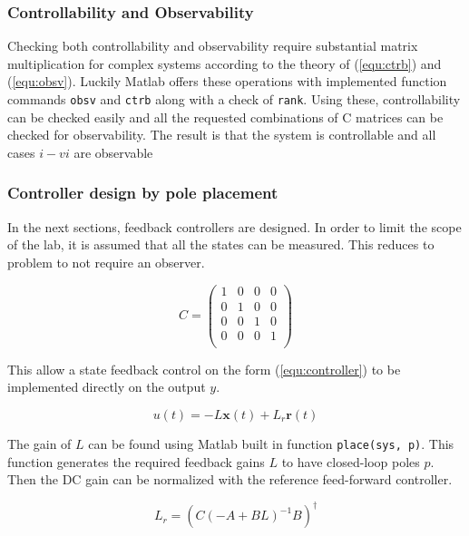 \documentclass[a4paper, titlepage]{article}
\begin{document}
\subsubsection{Controllability and Observability}
Checking both controllability and observability require substantial matrix multiplication for complex systems according to the theory of (\ref{equ:ctrb}) and (\ref{equ:obsv}).
Luckily Matlab offers these operations with implemented function commands \verb|obsv| and \verb|ctrb| along with a check of \verb|rank|.
Using these, controllability can be checked easily and all the requested combinations of C matrices can be checked for observability.
The result is that the system is controllable and all cases $i - vi$ are observable

\subsubsection{Controller design by pole placement}
In the next sections, feedback controllers are designed.
In order to limit the scope of the lab, it is assumed that all the states can be measured.
This reduces to problem to not require an observer.

\begin{equation}
C = \begin{pmatrix}
1 & 0 & 0 & 0 \\
0 & 1 & 0 & 0 \\
0 & 0 & 1 & 0 \\
0 & 0 & 0 & 1 \\ 
\end{pmatrix}
\end{equation}

This allow a state feedback control on the form (\ref{equ:controller}) to be implemented directly on the output $y$.

\begin{equation}
u(t) = -L\textbf{x}(t) + L_r\textbf{r}(t)
\label{equ:controller}
\end{equation}

The gain of $L$ can be found using Matlab built in function \verb|place(sys, p)|.
This function generates the required feedback gains $L$ to have closed-loop poles $p$.
Then the DC gain can be normalized with the reference feed-forward controller.

\begin{equation}
L_r = (C(-A + BL)^{-1}B)^{\dagger}
\label{equ:prefilter}
\end{equation}
\end{document}
